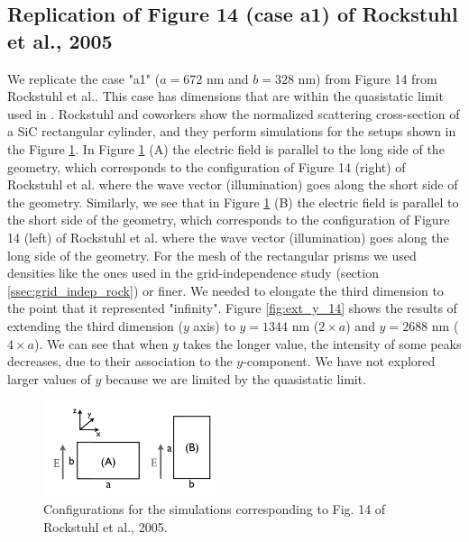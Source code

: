\subsection{Replication of Figure 14 (case a1) of Rockstuhl et al., 2005}

We replicate the case "a1" ($a=672$ nm and $b=328$ nm) from Figure 14 from Rockstuhl et al.. This 
case has dimensions that are within the quasistatic limit used in \pygbe. Rockstuhl and coworkers show the normalized
scattering cross-section of a SiC rectangular cylinder, and they perform simulations for the setups shown in the Figure
\ref{fig:rectangle_sketch}. In Figure \ref{fig:rectangle_sketch} (A) the electric field is parallel to the long side of the geometry, which 
corresponds to the configuration of Figure 14 (right) of Rockstuhl et al. where the wave vector (illumination) goes along the short side of the geometry. 
Similarly, we see that in Figure \ref{fig:rectangle_sketch} (B) the electric field is parallel to the short side of the geometry, which 
corresponds to the configuration of Figure 14 (left) of Rockstuhl et al. where the wave vector (illumination) goes along the long side of the geometry.
For the mesh of the rectangular prisms we used densities like the ones used in the grid-independence study (section \ref{ssec:grid_indep_rock}) or finer. We 
needed to elongate the third dimension to the point that it represented "infinity". Figure \ref{fig:ext_y_14} shows the results of extending the third 
dimension ($y$ axis) to $y=1344$ nm ($2\times a$) and $y=2688$ nm ($4\times a$). We can see that when $y$ takes the longer value, the intensity of 
some peaks decreases, due to their association to the $y$-component. We have not explored larger values of $y$ because we are limited by the quasistatic limit.

 \begin{figure}
    \centering
    \includegraphics[width=0.45\textwidth]{rockstuhl_rectangles.pdf} 
    \caption{Configurations for the simulations corresponding to Fig. 14 of Rockstuhl et al., 2005.}
    \label{fig:rectangle_sketch}
\end{figure}

